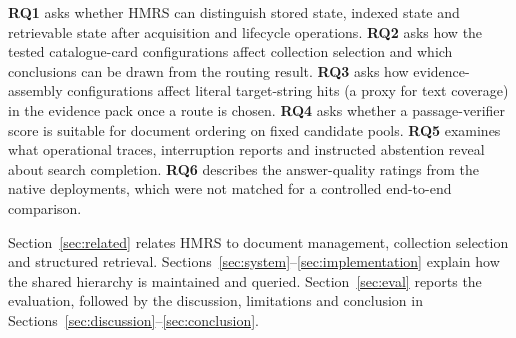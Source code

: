 \textbf{RQ1} asks whether HMRS can distinguish stored state, indexed state
and retrievable state after acquisition and lifecycle operations.
\textbf{RQ2} asks how the tested catalogue-card configurations affect
collection selection and which conclusions can be drawn from the routing result.
\textbf{RQ3} asks how evidence-assembly configurations affect literal target-string hits (a proxy for text coverage) in the evidence pack once a route is chosen.
\textbf{RQ4} asks whether a passage-verifier score is suitable for document
ordering on fixed candidate pools. \textbf{RQ5} examines what operational
traces, interruption reports and instructed abstention reveal about search
completion. \textbf{RQ6} describes the answer-quality ratings from the native deployments, which were not matched for a controlled end-to-end comparison.

Section~\ref{sec:related} relates HMRS to document management, collection
selection and structured retrieval. Sections~\ref{sec:system}--\ref{sec:implementation}
explain how the shared hierarchy is maintained and queried. Section~\ref{sec:eval}
reports the evaluation, followed by the discussion, limitations and conclusion
in Sections~\ref{sec:discussion}--\ref{sec:conclusion}.

